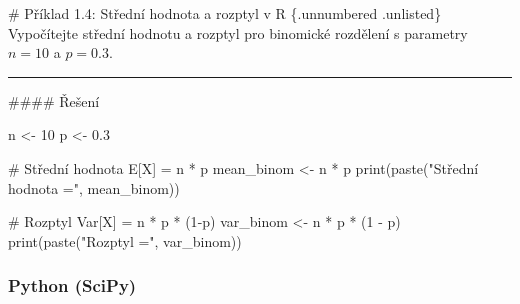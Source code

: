 \documentclass[
  czech,
  11pt,
  letterpaper,
  DIV=11,
  numbers=noendperiod]{scrreprt}
\newenvironment{Shaded}{\begin{snugshade}}{\end{snugshade}}
\newcommand{\CommentTok}[1]{\textcolor[rgb]{0.37,0.37,0.37}{#1}}
\newcommand{\DecValTok}[1]{\textcolor[rgb]{0.68,0.00,0.00}{#1}}
\newcommand{\FloatTok}[1]{\textcolor[rgb]{0.68,0.00,0.00}{#1}}
\newcommand{\FunctionTok}[1]{\textcolor[rgb]{0.28,0.35,0.67}{#1}}
\newcommand{\NormalTok}[1]{\textcolor[rgb]{0.00,0.23,0.31}{#1}}
\newcommand{\OtherTok}[1]{\textcolor[rgb]{0.00,0.23,0.31}{#1}}
\newcommand{\SpecialCharTok}[1]{\textcolor[rgb]{0.37,0.37,0.37}{#1}}
\newcommand{\StringTok}[1]{\textcolor[rgb]{0.13,0.47,0.30}{#1}}
\begin{document}
\begin{tcolorbox}[enhanced jigsaw, arc=.35mm, bottomrule=.15mm, bottomtitle=1mm, breakable, colback=white, colbacktitle=quarto-callout-note-color!10!white, colframe=quarto-callout-note-color-frame, coltitle=black, left=2mm, leftrule=.75mm, opacityback=0, opacitybacktitle=0.6, rightrule=.15mm, title=\textcolor{quarto-callout-note-color}{\faInfo}\hspace{0.5em}{Poznámka}, titlerule=0mm, toprule=.15mm, toptitle=1mm]

\# Příklad 1.4: Střední hodnota a rozptyl v R \{.unnumbered .unlisted\}
Vypočítejte střední hodnotu a rozptyl pro binomické rozdělení s
parametry \(n=10\) a \(p=0.3\).

\begin{center}\rule{0.5\linewidth}{0.5pt}\end{center}

\#\#\#\# Řešení

\begin{Shaded}
\begin{Highlighting}[]
\NormalTok{n }\OtherTok{\textless{}{-}} \DecValTok{10}
\NormalTok{p }\OtherTok{\textless{}{-}} \FloatTok{0.3}

\CommentTok{\# Střední hodnota E[X] = n * p}
\NormalTok{mean\_binom }\OtherTok{\textless{}{-}}\NormalTok{ n }\SpecialCharTok{*}\NormalTok{ p}
\FunctionTok{print}\NormalTok{(}\FunctionTok{paste}\NormalTok{(}\StringTok{"Střední hodnota ="}\NormalTok{, mean\_binom))}

\CommentTok{\# Rozptyl Var[X] = n * p * (1{-}p)}
\NormalTok{var\_binom }\OtherTok{\textless{}{-}}\NormalTok{ n }\SpecialCharTok{*}\NormalTok{ p }\SpecialCharTok{*}\NormalTok{ (}\DecValTok{1} \SpecialCharTok{{-}}\NormalTok{ p)}
\FunctionTok{print}\NormalTok{(}\FunctionTok{paste}\NormalTok{(}\StringTok{"Rozptyl ="}\NormalTok{, var\_binom))}
\end{Highlighting}
\end{Shaded}

\end{tcolorbox}

\subsubsection*{Python (SciPy)}\label{python-scipy}
\end{document}
